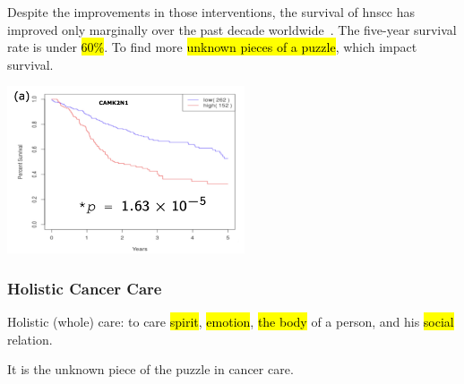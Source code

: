 \documentclass[
paper=landscape,
paper=160mm:90mm, %
fontsize=11pt, %
pagesize, %
parskip=half-, %
]{scrartcl} %
\theoremstyle{mythmstyle} %
\begin{document}
\begin{minipage}[c]{0.40\linewidth}
\begin{outline}
    \1 Despite the improvements in those interventions, the survival of \acrshort{hnscc} has improved only marginally over the past decade worldwide~\cite{hpa2019}.
    \1 The five-year survival rate is under \hl{60\%}.
    \1 To find more \hl{unknown pieces of a puzzle}, which impact survival.
\end{outline}
\end{minipage}%
\begin{minipage}[c]{0.55\linewidth}
    \raggedright
    \hfill\includegraphics[width=7cm]{KMplot_CAMK2N1.pdf}
\end{minipage}




\clearpage



\subsubsection{Holistic Cancer Care} 

\thispagestyle{headings}

Holistic (whole) care: to care \hl{spirit}, \hl{emotion}, \hl{the body} of a person, and his \hl{social} relation.

It is the unknown piece of the puzzle in cancer care.
\end{document}
